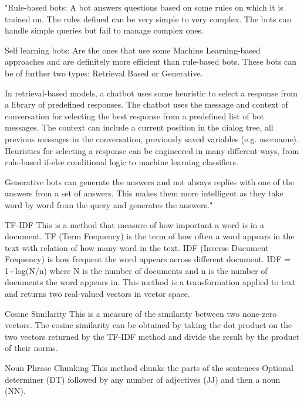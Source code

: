 "Rule-based bots:
A bot answers questions based on some rules on which it is trained on. The rules defined can be very simple to very complex. The bots can handle simple queries but fail to manage complex ones.

Self learning bots:
Are the ones that use some Machine Learning-based approaches and are definitely more efficient than rule-based bots. These bots can be of further two types: 
Retrieval Based or Generative.

In retrieval-based models, a chatbot uses some heuristic to select a response from a library of predefined responses. The chatbot uses the message and context of conversation for selecting the best response from a predefined list of bot messages. The context can include a current position in the dialog tree, all previous messages in the conversation, previously saved variables (e.g. username). Heuristics for selecting a response can be engineered in many different ways, from rule-based if-else conditional logic to machine learning classifiers.

Generative bots can generate the answers and not always replies with one of the answers from a set of answers. This makes them more intelligent as they take word by word from the query and generates the answers."

TF-IDF
This is a method that measure of how important a word is in a document. 
TF (Term Frequency) is the term of how often a word appears in the text with relation of how many word in the text. 
IDF (Inverse Ducument Frequency) is how frequent the word appears across different document. IDF = 1+log(N/n) where N is the number of documents and n is the number of documents the word appears in.   
This method is a transformation applied to text and returns two real-valued vectors in vector space. 

Cosine Similarity
This is a measure of the similarity between two none-zero vectors.
The cosine similarity can be obtained by taking the dot product on the two vectors returned by the TF-IDF method and divide the result by the product of their norms.  


Noun Phrase Chunking
This method chunks the parts of the sentences  
Optional determiner (DT) followed by any number of adjectives (JJ) and then a noun (NN). 

